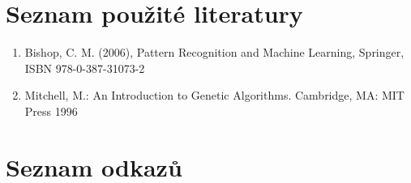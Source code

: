 \documentclass[a4paper,11pt, oneside]{book} \usepackage[czech]{babel}
\begin{document}
	\chapter{Seznam použité literatury}

	\begin{enumerate}
	\item Bishop, C. M. (2006), Pattern Recognition
	and Machine Learning, Springer, ISBN 978-0-387-31073-2

		\item Mitchell, M.: An Introduction to Genetic Algorithms. Cambridge, MA: MIT Press 1996
	\end{enumerate}

	\chapter{Seznam odkazů}
\end{document}
